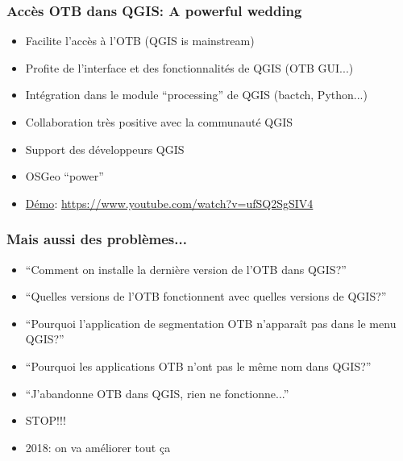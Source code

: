 \documentclass[8pt]{beamer}
\begin{document}
\begin{frame}
\frametitle{Accès OTB dans QGIS: A powerful wedding}
\begin{itemize}
\item Facilite l'accès à l'OTB (QGIS is mainstream)
\item Profite de l'interface et des fonctionnalités de QGIS (OTB GUI...)
\item Intégration dans le module ``processing'' de QGIS (bactch, Python...)
\item Collaboration très positive avec la communauté QGIS
\item Support des développeurs QGIS
\item OSGeo ``power''
\item \href{https://www.youtube.com/watch?v=ufSQ2SgSIV4}{Démo}: \url{https://www.youtube.com/watch?v=ufSQ2SgSIV4}
\end{itemize}
\end{frame}

\begin{frame}
\frametitle{Mais aussi des problèmes...}
\begin{itemize}
\item ``Comment on installe la dernière version de l'OTB dans QGIS?''
\item ``Quelles versions de l'OTB fonctionnent avec quelles versions de QGIS?''
\item ``Pourquoi l'application de segmentation OTB n'apparaît pas dans le menu QGIS?''
\item ``Pourquoi les applications OTB n'ont pas le même nom dans QGIS?''
\item ``J'abandonne OTB dans QGIS, rien ne fonctionne...''
\item \alert{STOP!!!}
\item 2018: on va améliorer tout ça
\end{itemize}

\end{frame}
\end{document}
